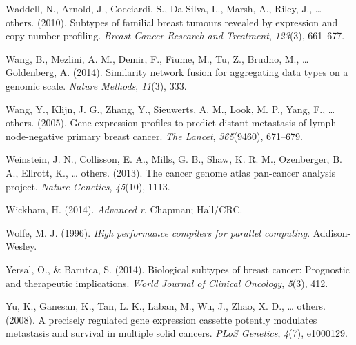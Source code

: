 \documentclass[12pt,twoside]{reedthesis}
\begin{document}
\leavevmode\hypertarget{ref-waddell2010subtypes}{}%
Waddell, N., Arnold, J., Cocciardi, S., Da Silva, L., Marsh, A., Riley, J., \ldots{} others. (2010). Subtypes of familial breast tumours revealed by expression and copy number profiling. \emph{Breast Cancer Research and Treatment}, \emph{123}(3), 661--677.

\leavevmode\hypertarget{ref-wang2014similarity}{}%
Wang, B., Mezlini, A. M., Demir, F., Fiume, M., Tu, Z., Brudno, M., \ldots{} Goldenberg, A. (2014). Similarity network fusion for aggregating data types on a genomic scale. \emph{Nature Methods}, \emph{11}(3), 333.

\leavevmode\hypertarget{ref-wang2005gene}{}%
Wang, Y., Klijn, J. G., Zhang, Y., Sieuwerts, A. M., Look, M. P., Yang, F., \ldots{} others. (2005). Gene-expression profiles to predict distant metastasis of lymph-node-negative primary breast cancer. \emph{The Lancet}, \emph{365}(9460), 671--679.

\leavevmode\hypertarget{ref-weinstein2013cancer}{}%
Weinstein, J. N., Collisson, E. A., Mills, G. B., Shaw, K. R. M., Ozenberger, B. A., Ellrott, K., \ldots{} others. (2013). The cancer genome atlas pan-cancer analysis project. \emph{Nature Genetics}, \emph{45}(10), 1113.

\leavevmode\hypertarget{ref-wickham2014advanced}{}%
Wickham, H. (2014). \emph{Advanced r}. Chapman; Hall/CRC.

\leavevmode\hypertarget{ref-wolfe1996high}{}%
Wolfe, M. J. (1996). \emph{High performance compilers for parallel computing}. Addison-Wesley.

\leavevmode\hypertarget{ref-yersal2014biological}{}%
Yersal, O., \& Barutca, S. (2014). Biological subtypes of breast cancer: Prognostic and therapeutic implications. \emph{World Journal of Clinical Oncology}, \emph{5}(3), 412.

\leavevmode\hypertarget{ref-yu2008precisely}{}%
Yu, K., Ganesan, K., Tan, L. K., Laban, M., Wu, J., Zhao, X. D., \ldots{} others. (2008). A precisely regulated gene expression cassette potently modulates metastasis and survival in multiple solid cancers. \emph{PLoS Genetics}, \emph{4}(7), e1000129.


\end{document}
